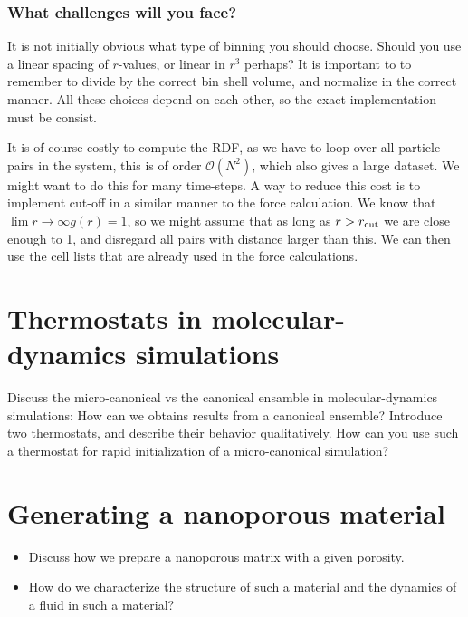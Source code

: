 \documentclass[a4paper, 11pt, notitlepage, english]{article}
\begin{document}
\subsubsection*{What challenges will you face?}

It is not initially obvious what type of binning you should choose. Should you use a linear spacing of $r$-values, or linear in $r^3$ perhaps? It is important to to remember to divide by the correct bin shell volume, and normalize in the correct manner. All these choices depend on each other, so the exact implementation must be consist.

It is of course costly to compute the RDF, as we have to loop over all particle pairs in the system, this is of order $\mathcal{O}(N^2)$, which also gives a large dataset. We might want to do this for many time-steps. A way to reduce this cost is to implement cut-off in a similar manner to the force calculation. We know that $\lim r \to \infty g(r) = 1$, so we might assume that as long as $r > r_{\rm cut}$ we are close enough to 1, and disregard all pairs with distance larger than this. We can then use the cell lists that are already used in the force calculations.

\clearpage


\section{Thermostats in molecular-dynamics simulations}
Discuss the micro-canonical vs the canonical ensamble in molecular-dynamics
simulations: How can we obtains results from a canonical ensemble? Introduce
two thermostats, and describe their behavior qualitatively. How can you use
such a thermostat for rapid initialization of a micro-canonical simulation?

\clearpage



\section{Generating a nanoporous material}
\begin{itemize}
	\item Discuss how we prepare a nanoporous matrix with a given porosity.
	\item How do we characterize the structure of such a material and the dynamics of a fluid in such
a material?
\end{itemize}
\end{document}
